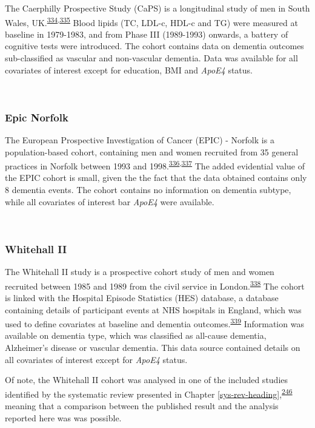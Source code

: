 \documentclass[a4paper, twoside]{templates/ociamthesis}
\begin{document}
The Caerphilly Prospective Study (CaPS) is a longitudinal study of men in South Wales, UK.\textsuperscript{\protect\hyperlink{ref-zotero-15398}{334},\protect\hyperlink{ref-elwood2013}{335}} Blood lipids (TC, LDL-c, HDL-c and TG) were measured at baseline in 1979-1983, and from Phase III (1989-1993) onwards, a battery of cognitive tests were introduced. The cohort contains data on dementia outcomes sub-classified as vascular and non-vascular dementia. Data was available for all covariates of interest except for education, BMI and \emph{ApoE4} status.

~

\hypertarget{epic-norfolk}{%
\subsubsection{Epic Norfolk}\label{epic-norfolk}}

The European Prospective Investigation of Cancer (EPIC) - Norfolk is a population-based cohort, containing men and women recruited from 35 general practices in Norfolk between 1993 and 1998.\textsuperscript{\protect\hyperlink{ref-riboli1997}{336},\protect\hyperlink{ref-riboli2002}{337}} The added evidential value of the EPIC cohort is small, given the the fact that the data obtained contains only 8 dementia events. The cohort contains no information on dementia subtype, while all covariates of interest bar \emph{ApoE4} were available.

~

\hypertarget{whitehall-ii}{%
\subsubsection{Whitehall II}\label{whitehall-ii}}

The Whitehall II study is a prospective cohort study of men and women recruited between 1985 and 1989 from the civil service in London.\textsuperscript{\protect\hyperlink{ref-marmot2005}{338}} The cohort is linked with the Hospital Episode Statistics (HES) database, a database containing details of participant events at NHS hospitals in England, which was used to define covariates at baseline and dementia outcomes.\textsuperscript{\protect\hyperlink{ref-zotero-15403}{339}} Information was available on dementia type, which was classified as all-cause dementia, Alzheimer's disease or vascular dementia. This data source contained details on all covariates of interest except for \emph{ApoE4} status.

Of note, the Whitehall II cohort was analysed in one of the included studies identified by the systematic review presented in Chapter \ref{sys-rev-heading},\textsuperscript{\protect\hyperlink{ref-tynkkynen2018}{246}} meaning that a comparison between the published result and the analysis reported here was was possible.
\end{document}
